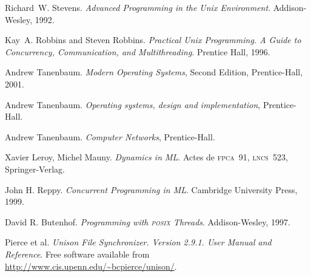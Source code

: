 \begin{thebibliography}{9}
Richard~W. Stevens.
\newblock \emph{Advanced Programming in the Unix Environment}.
\newblock Addison-Wesley, 1992.

Kay~A. Robbins and Steven Robbins.
\newblock \emph{Practical Unix Programming.
A Guide to Concurrency, Communication, and Multithreading}.
\newblock Prentice Hall, 1996.


Andrew Tanenbaum. \emph{Modern Operating Systems},
Second Edition, Prentice-Hall, 2001. 
 

Andrew Tanenbaum. \emph{Operating systems, design and implementation},
Prentice-Hall.

Andrew Tanenbaum. \emph{Computer Networks}, Prentice-Hall.


Xavier Leroy, Michel Mauny. \emph{Dynamics in ML}. Actes de \textsc{fpca}~91,
\textsc{lncs}~523, Springer-Verlag.

John H. Reppy. \emph{Concurrent Programming in ML}.
Cambridge University Press, 1999.     


David R. Butenhof. 
\emph{{P}rogramming with {\textsc{posix}} {T}hreads}.
Addison-Wesley, 1997.


Pierce et al.
\emph{Unison File Synchronizer. Version 2.9.1.
User Manual and Reference}. 
Free software available from  
\url{http://www.cis.upenn.edu/~bcpierce/unison/}. 
\end{thebibliography}
